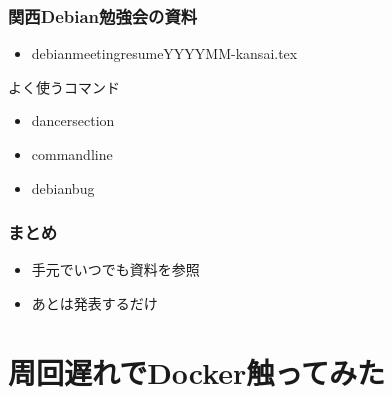 \documentclass[cjk,dvipdfmx,10pt,compress,%
hyperref={bookmarks=true,bookmarksnumbered=true,bookmarksopen=false,%
colorlinks=false,%
pdftitle={第 107 回 関西 Debian 勉強会},%
pdfauthor={倉敷・のがた・佐々木・かわだ},%
pdfsubject={資料},%
}]{beamer}
\begin{document}
\begin{frame}
  \frametitle{ 関西Debian勉強会の資料 }
  \begin{itemize}
  \item debianmeetingresumeYYYYMM-kansai.tex
  \end{itemize}
  \begin{block}{よく使うコマンド}
    \begin{itemize}
    \item dancersection
    \item commandline
    \item debianbug
    \end{itemize}
  \end{block}
\end{frame}

\begin{frame}
  \frametitle{ まとめ }
  \begin{itemize}
  \item 手元でいつでも資料を参照
  \item あとは発表するだけ
  \end{itemize}
\end{frame}

\section{周回遅れでDocker触ってみた}
\end{document}
